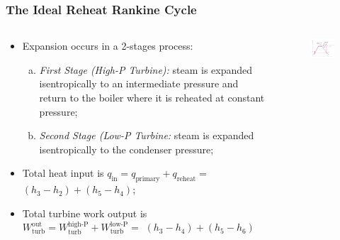 \documentclass[10pt,compress]{beamer}
\begin{document}
\begin{frame}
 \frametitle{The Ideal Reheat Rankine Cycle}
  \begin{columns}
   \begin{column}[c]{0.5\linewidth}

 \begin{itemize} %
  \item <1-> Expansion occurs in a 2-stages process:
  \begin{enumerate}[(a)] %
   \item <2-> {\it First Stage (High-P Turbine):} steam is expanded isentropically to an intermediate pressure and return to the boiler where it is reheated at constant pressure;
   \item <3-> {\it Second Stage (Low-P Turbine:} steam is expanded isentropically to the condenser pressure;
  \end{enumerate}
  \item <4-> Total heat input is $q_{\text{in}}=q_{\text{primary}}+q_{\text{reheat}}=$$\left(h_{3}-h_{2}\right)+\left(h_{5}-h_{4}\right)$;
  \item <5-> Total turbine work output is $W_{\text{turb}}^{\text{out}} = W_{\text{turb}}^{\text{high-P}} + W_{\text{turb}}^{\text{low-P}}=$ $\left(h_{3}-h_{4}\right)+\left(h_{5}-h_{6}\right)$
 \end{itemize} 
   \end{column}

   \begin{column}[c]{0.5\linewidth} 
    \begin{figure}%
     \begin{center}
      \includegraphics[width=6.25cm,clip]{./Pics/Reheat_Rankine_Cycle_Diagram}
     \end{center}
    \end{figure}  
   \end{column}
  \end{columns}

 \normalsize
\end{frame}
\end{document}
